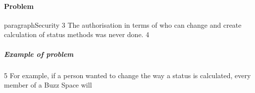 
\paragraph{Problem }
paragraph{Security} 
3 	The authorisation in terms of who can change and create calculation of status methods was never done.  
4 	\subparagraph{Example of problem} 
5 		For example, if a person wanted to change the way a status is calculated, every member of a Buzz Space will  
